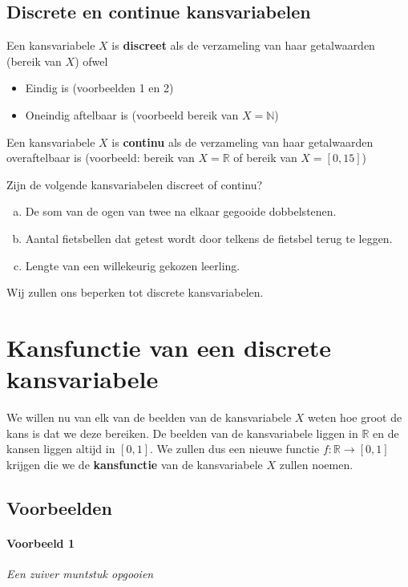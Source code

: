 \documentclass[a4paper,12pt, twoside]{article}
\begin{document}
\subsection{Discrete en continue kansvariabelen}

Een kansvariabele $X$ is {\bf discreet} als de verzameling van haar getalwaarden (bereik van $X$) ofwel
\begin{itemize}
  \item Eindig is (voorbeelden 1 en 2)
  \item Oneindig aftelbaar is (voorbeeld bereik van $X=\mathbb{N}$)
\end{itemize}

Een kansvariabele $X$ is {\bf continu} als de verzameling van haar getalwaarden overaftelbaar is (voorbeeld: bereik van $X = \mathbb{R}$ of bereik van $X = [0,15]$)

\begin{oefening}
Zijn de volgende kansvariabelen discreet of continu?
\begin{enumerate}[(a)]
  \item De som van de ogen van twee na elkaar gegooide dobbelstenen.
  \item Aantal fietsbellen dat getest wordt door telkens de fietsbel terug te leggen.
  \item Lengte van een willekeurig gekozen leerling.
\end{enumerate}
\end{oefening}

{\scriptsize Wij zullen ons beperken tot discrete kansvariabelen.}
\vspace*{-1cm}

\pagebreak
\section{Kansfunctie van een discrete kansvariabele}

We willen nu van elk van de beelden van de kansvariabele $X$ weten hoe groot de kans is dat we deze bereiken. De beelden van de kansvariabele liggen in $\mathbb{R}$ en de kansen liggen altijd in $[0,1]$. We zullen dus een nieuwe functie $f:\mathbb{R}\to[0,1]$ krijgen die we de {\bf kansfunctie} van de kansvariabele $X$ zullen noemen.

\subsection{Voorbeelden}

\paragraph*{Voorbeeld 1} {\em Een zuiver muntstuk opgooien}
\end{document}
